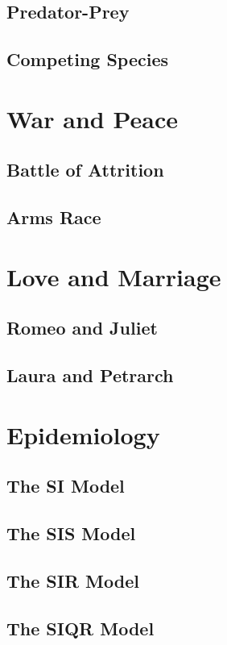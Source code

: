 \documentclass{book}
\begin{document}
\subsection{Predator-Prey}
\subsection{Competing Species}
\section{War and Peace}
\subsection{Battle of Attrition}
\subsection{Arms Race}
\section{Love and Marriage}
\subsection{Romeo and Juliet}
\subsection{Laura and Petrarch}
\section{Epidemiology}
\subsection{The SI Model}
\subsection{The SIS Model}
\subsection{The SIR Model}
\subsection{The SIQR Model}
\end{document}
